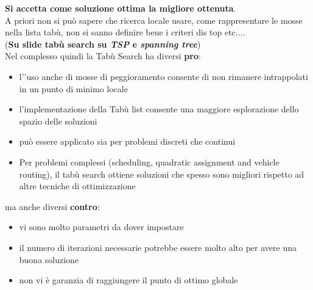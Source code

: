 \message{ !name(ro.tex)}\documentclass[a4paper,12pt, oneside]{book}
\begin{document}
\textbf{Si accetta come soluzione ottima la migliore ottenuta}.\\
A priori non si può sapere che ricerca locale usare, come
rappresentare le mosse nella lista tabù, non si sanno definire bene i
criteri dis top etc$\ldots$. \\
(\textbf{Su slide tabù search su \textit{TSP} e \textit{spanning
    tree}})\\
Nel complesso quindi la Tabù Search ha diversi \textbf{pro}:
\begin{itemize}
  \item l'’uso anche di mosse di peggioramento consente di non
  rimanere intrappolati in un punto di minimo locale
  \item l'implementazione della Tabù list consente una maggiore
  esplorazione dello spazio delle soluzioni 
  \item può essere applicato sia per problemi discreti che continui
  \item Per problemi complessi (scheduling, quadratic assignment and
  vehicle routing), il tabù search ottiene soluzioni che spesso sono
  migliori rispetto ad altre tecniche di ottimizzazione 
\end{itemize}
ma anche diversi \textbf{contro}:
\begin{itemize}
  \item vi sono molto parametri da dover impostare
  \item il numero di iterazioni necessarie potrebbe essere molto alto
  per avere una buona soluzione
  \item non vi è garanzia di raggiungere il punto di ottimo globale
\end{itemize}
\end{document}
